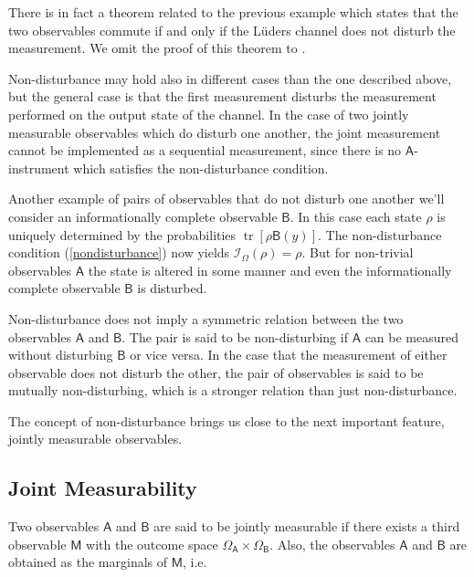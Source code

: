 \documentclass[a4paper,12pt]{wihuri}
\theoremstyle{definition}
\numberwithin{definition}{section}
\numberwithin{example}{section}
\numberwithin{theorem}{section}
\numberwithin{proposition}{section}
\numberwithin{lemma}{section}
\newcommand{\I}{\mathcal{I}}%
\newcommand{\A}{\mathsf{A}}%
\newcommand{\B}{\mathsf{B}}%
\newcommand{\M}{\mathsf{M}}%
\DeclareMathOperator{\tr}{tr}
\begin{document}
There is in fact a theorem related to the previous example which states that the two observables commute if and only if the Lüders channel does not disturb the measurement. We omit the proof of this theorem to \cite{luders}.

Non-disturbance may hold also in different cases than the one described above, but the general case is that the first measurement disturbs the measurement performed on the output state of the channel. In the case of two jointly measurable observables which do disturb one another, the joint measurement cannot be implemented as a sequential measurement, since there is no $\A$-instrument which satisfies the non-disturbance condition\cite{heinosaari_wolf_nondisturbance}.

Another example of pairs of observables that do not disturb one another we'll consider an informationally complete observable $\B$. In this case each state $\rho$ is uniquely determined by the probabilities $\tr[\rho\B(y)]$. The non-disturbance condition (\ref{nondisturbance}) now yields $\I_{\Omega}(\rho) = \rho$. But for non-trivial observables $\A$ the state is altered in some manner and even the informationally complete observable $\B$ is disturbed.

Non-disturbance does not imply a symmetric relation between the two observables $\A$ and $\B$. The pair is said to be non-disturbing if $\A$ can be measured without disturbing $\B$ or vice versa. In the case that the measurement of either observable does not disturb the other, the pair of observables is said to be mutually non-disturbing, which is a stronger relation than just non-disturbance\cite{heinosaari_simultaneous}.

The concept of non-disturbance brings us close to the next important feature, jointly measurable observables.


\subsection{Joint Measurability}
Two observables $\A$ and $\B$ are said to be jointly measurable if there exists a third observable  $\M$ with the outcome space $\Omega_{\A} \times \Omega_{\B}$. Also, the observables $\A$ and $\B$ are obtained as the marginals of $\M$, i.e.
\end{document}
